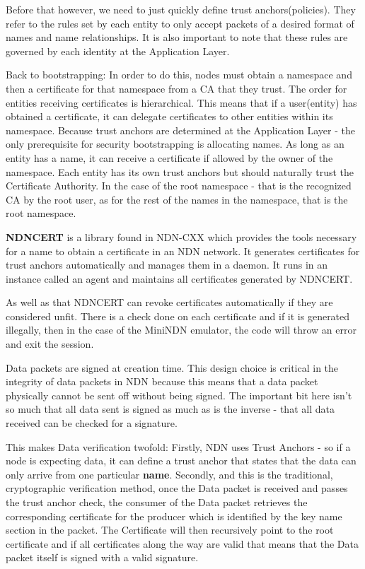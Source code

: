  Before that however, we need to just quickly define trust anchors(policies). They refer to the rules set by each entity to only accept packets of a desired format of names and name relationships\cite{042}. It is also important to note that these rules are governed by each identity at the Application Layer.
 
  Back to bootstrapping: In order to do this, nodes must obtain a namespace and then a certificate for that namespace from a CA that they trust\cite{043}. The order for entities receiving certificates is hierarchical. This means that if a user(entity) has obtained a certificate, it can delegate certificates to other entities within its namespace.
 Because trust anchors are determined at the Application Layer - the only prerequisite\cite{044} for security bootstrapping is allocating names. As long as an entity has a name, it can receive a certificate if allowed by the owner of the namespace. 
 Each entity has its own trust anchors but should naturally trust the Certificate Authority. In the case of the root namespace - that is the recognized CA by the root user, as for the rest of the names in the namespace, that is the root namespace.\par
 \textbf{NDNCERT} is a library found in NDN-CXX which provides the tools necessary for a name to obtain a certificate in an NDN network. It generates certificates for trust anchors automatically and manages them in a daemon\cite{045}. It runs in an instance called an agent and maintains all certificates generated by NDNCERT.\par
As well as that NDNCERT can revoke certificates automatically if they are considered unfit. There is a check done on each certificate and if it is generated illegally, then in the case of the MiniNDN emulator, the code will throw an error and exit the session.\par
Data packets are signed at creation time\cite{046}. This design choice is critical in the integrity of data packets in NDN because this means that a data packet physically cannot be sent off without being signed. The important bit here isn't so much that all data sent is signed as much as is the inverse - that all data received can be checked for a signature. 

This makes Data verification twofold: Firstly, NDN uses Trust Anchors - so if a node is expecting data, it can define a trust anchor that states that the data can only arrive from one particular \textbf{name}. Secondly, and this is the traditional, cryptographic verification method, once the Data packet is received and passes the trust anchor check, the consumer of the Data packet retrieves the corresponding certificate for the producer which is identified by the key name section in the packet\cite{047}. The Certificate will then recursively point to the root certificate and if all certificates along the way are valid that means that the Data packet itself is signed with a valid signature.

